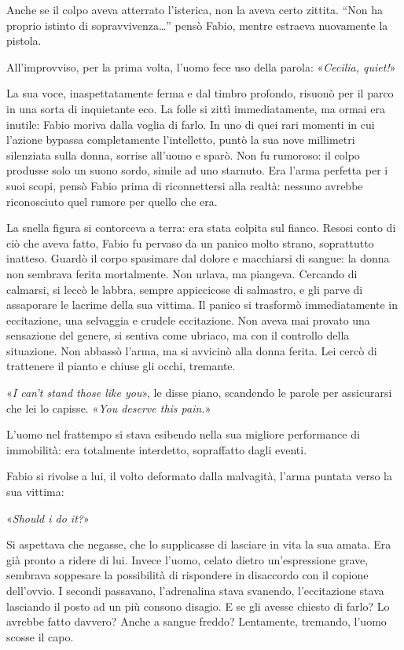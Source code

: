 Anche se il colpo aveva atterrato l'isterica, non la aveva certo zittita. ``Non ha proprio istinto di sopravvivenza\ldots'' pensò Fabio, mentre estraeva nuovamente la pistola.

All'improvviso, per la prima volta, l'uomo fece uso della parola: «\textit{Cecilia, quiet!}»

La sua voce, inaspettatamente ferma e dal timbro profondo, risuonò per il parco in una sorta di inquietante eco. La folle si zittì immediatamente, ma ormai era inutile: Fabio moriva dalla voglia di farlo. In uno di quei rari momenti in cui l'azione bypassa completamente l'intelletto, puntò la sua nove millimetri silenziata sulla donna, sorrise all'uomo e sparò. Non fu rumoroso: il colpo produsse solo un suono sordo, simile ad uno starnuto. Era l'arma perfetta per i suoi scopi, pensò Fabio prima di riconnettersi alla realtà: nessuno avrebbe riconosciuto quel rumore per quello che era.

La snella figura si contorceva a terra: era stata colpita sul fianco. Resosi conto di ciò che aveva fatto, Fabio fu pervaso da un panico molto strano, soprattutto inatteso. Guardò il corpo spasimare dal dolore e macchiarsi di sangue: la donna non sembrava ferita mortalmente. Non urlava, ma piangeva. Cercando di calmarsi, si leccò le labbra, sempre appiccicose di salmastro, e gli parve di assaporare le lacrime della sua vittima. Il panico si trasformò immediatamente in eccitazione, una selvaggia e crudele eccitazione. Non aveva mai provato una sensazione del genere, si sentiva come ubriaco, ma con il controllo della situazione. Non abbassò l'arma, ma si avvicinò alla donna ferita. Lei cercò di trattenere il pianto e chiuse gli occhi, tremante.

«\textit{I can't stand those like you}», le disse piano, scandendo le parole per assicurarsi che lei lo capisse. «\textit{You deserve this pain.}»

L'uomo nel frattempo si stava esibendo nella sua migliore performance di immobilità: era totalmente interdetto, sopraffatto dagli eventi.

Fabio si rivolse a lui, il volto deformato dalla malvagità, l'arma puntata verso la sua vittima:

«\textit{Should i do it?}»

Si aspettava che negasse, che lo supplicasse di lasciare in vita la sua amata. Era già pronto a ridere di lui. Invece l'uomo, celato dietro un'espressione grave, sembrava soppesare la possibilità di rispondere in disaccordo con il copione dell'ovvio. I secondi passavano, l'adrenalina stava svanendo, l'eccitazione stava lasciando il posto ad un più consono disagio. E se gli avesse chiesto di farlo? Lo avrebbe fatto davvero? Anche a sangue freddo? Lentamente, tremando, l'uomo scosse il capo.

